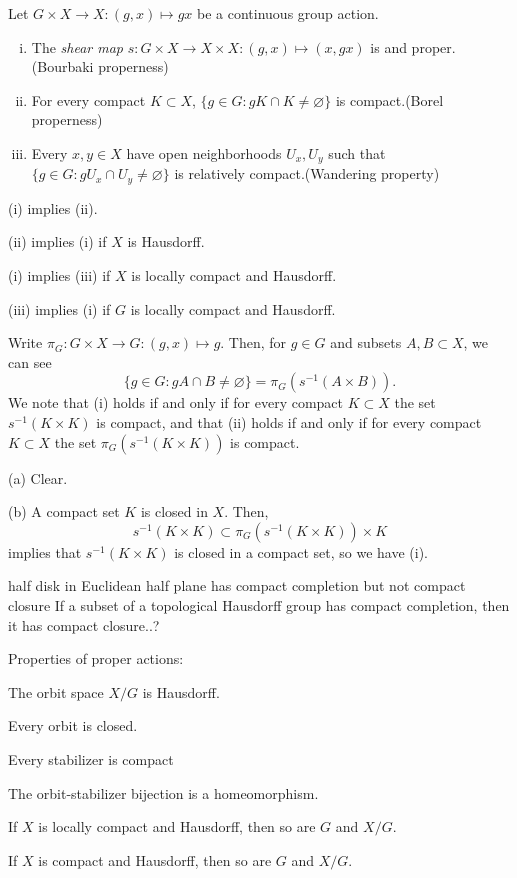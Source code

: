 \documentclass[a4paper]{article}
\begin{document}
\begin{prb}
Let $G\times X\to X:(g,x)\mapsto gx$ be a continuous group action.
\begin{enumerate}[(i)]
\item The \emph{shear map} $s:G\times X\to X\times X:(g,x)\mapsto(x,gx)$ is and proper.\hfill{(Bourbaki properness)}
\item For every compact $K\subset X$, $\{g\in G:gK\cap K\ne\varnothing\}$ is compact.\hfill{(Borel properness)}
\item Every $x,y\in X$ have open neighborhoods $U_x,U_y$ such that $\{g\in G:gU_x\cap U_y\ne\varnothing\}$ is relatively compact.\hfill{(Wandering property)}
\end{enumerate}
\begin{parts}
\item (i) implies (ii).
\item (ii) implies (i) if $X$ is Hausdorff.
\item (i) implies (iii) if $X$ is locally compact and Hausdorff.
\item (iii) implies (i) if $G$ is locally compact and Hausdorff.
\end{parts}
\end{prb}
\begin{pf}
Write $\pi_G:G\times X\to G:(g,x)\mapsto g$.
Then, for $g\in G$ and subsets $A,B\subset X$, we can see
\[\{g\in G:gA\cap B\ne\varnothing\}=\pi_G(s^{-1}(A\times B)).\]
We note that (i) holds if and only if for every compact $K\subset X$ the set $s^{-1}(K\times K)$ is compact, and that (ii) holds if and only if for every compact $K\subset X$ the set $\pi_G(s^{-1}(K\times K))$ is compact.

(a) Clear.

(b) A compact set $K$ is closed in $X$.
Then,
\[s^{-1}(K\times K)\subset\pi_G(s^{-1}(K\times K))\times K\]
implies that $s^{-1}(K\times K)$ is closed in a compact set, so we have (i).
\end{pf}


half disk in Euclidean half plane has compact completion but not compact closure
If a subset of a topological Hausdorff group has compact completion, then it has compact closure..?


Properties of proper actions:
\begin{parts}
\item The orbit space $X/G$ is Hausdorff.
\item Every orbit is closed.
\item Every stabilizer is compact
\item The orbit-stabilizer bijection is a homeomorphism.
\item If $X$ is locally compact and Hausdorff, then so are $G$ and $X/G$.
\item If $X$ is compact and Hausdorff, then so are $G$ and $X/G$.
\end{parts}
\end{document}
